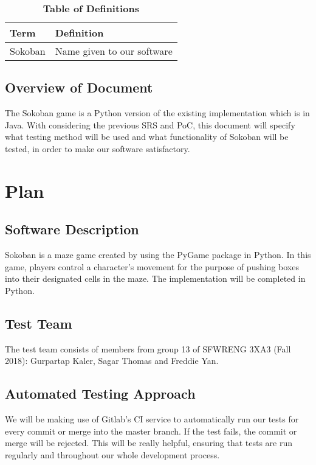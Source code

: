 \documentclass[12pt, titlepage]{article}
\begin{document}
\begin{table}[!htbp]
\caption{\textbf{Table of Definitions}} \label{Table}

\begin{tabularx}{\textwidth}{p{3cm}X}
\toprule
\textbf{Term} & \textbf{Definition}\\
\midrule
Sokoban & Name given to our software\\
\bottomrule
\end{tabularx}

\end{table}	

\subsection{Overview of Document}
The Sokoban game is a Python version of the existing implementation which is in Java. With considering the previous SRS and PoC, this document will specify what testing method will be used and what functionality of Sokoban will be tested, in order to make our software satisfactory.

\section{Plan}
	
\subsection{Software Description}
Sokoban is a maze game created by using the PyGame package in Python. In this game, players control a character's movement for the purpose of pushing boxes into their designated cells in the maze. The implementation will be completed in Python.

\subsection{Test Team}
The test team consists of members from group 13 of SFWRENG 3XA3 (Fall 2018): Gurpartap Kaler, Sagar Thomas and Freddie Yan.

\subsection{Automated Testing Approach}
We will be making use of Gitlab's CI service to automatically run our tests for every commit or merge into the master branch. If the test fails, the commit or merge will be rejected. This will be really helpful, ensuring that tests are run regularly and throughout our whole development process.
\end{document}
